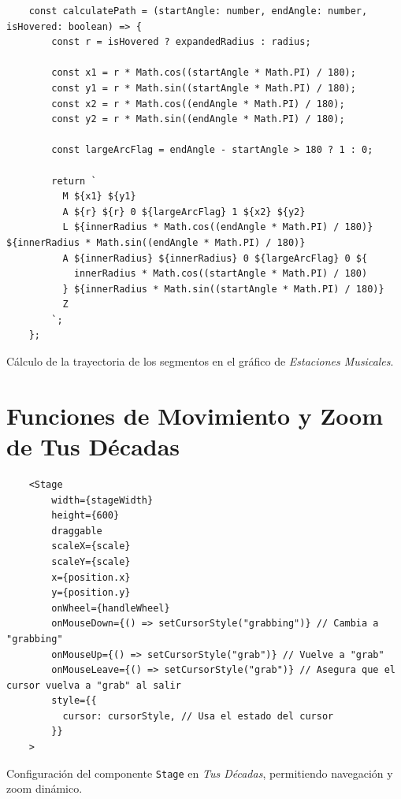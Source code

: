 \begin{ifalgorithm}[H]
  \begin{lstlisting}
    const calculatePath = (startAngle: number, endAngle: number, isHovered: boolean) => {
        const r = isHovered ? expandedRadius : radius;

        const x1 = r * Math.cos((startAngle * Math.PI) / 180);
        const y1 = r * Math.sin((startAngle * Math.PI) / 180);
        const x2 = r * Math.cos((endAngle * Math.PI) / 180);
        const y2 = r * Math.sin((endAngle * Math.PI) / 180);

        const largeArcFlag = endAngle - startAngle > 180 ? 1 : 0;

        return `
          M ${x1} ${y1}
          A ${r} ${r} 0 ${largeArcFlag} 1 ${x2} ${y2}
          L ${innerRadius * Math.cos((endAngle * Math.PI) / 180)} ${innerRadius * Math.sin((endAngle * Math.PI) / 180)}
          A ${innerRadius} ${innerRadius} 0 ${largeArcFlag} 0 ${
            innerRadius * Math.cos((startAngle * Math.PI) / 180)
          } ${innerRadius * Math.sin((startAngle * Math.PI) / 180)}
          Z
        `;
    };
    \end{lstlisting}
  \caption{Cálculo de la trayectoria de los segmentos en el gráfico de \textit{Estaciones Musicales}.}
  \label{alg:calculate_path}
\end{ifalgorithm}

\section*{Funciones de Movimiento y Zoom de Tus Décadas}

\begin{ifalgorithm}[H]
  \begin{lstlisting}
    <Stage
        width={stageWidth}
        height={600}
        draggable
        scaleX={scale}
        scaleY={scale}
        x={position.x}
        y={position.y}
        onWheel={handleWheel}
        onMouseDown={() => setCursorStyle("grabbing")} // Cambia a "grabbing"
        onMouseUp={() => setCursorStyle("grab")} // Vuelve a "grab"
        onMouseLeave={() => setCursorStyle("grab")} // Asegura que el cursor vuelva a "grab" al salir
        style={{
          cursor: cursorStyle, // Usa el estado del cursor
        }}
    >
    \end{lstlisting}
  \caption{Configuración del componente \texttt{Stage} en \textit{Tus Décadas}, permitiendo navegación y zoom dinámico.}
  \label{alg:stage_tus_decadas}
\end{ifalgorithm}

